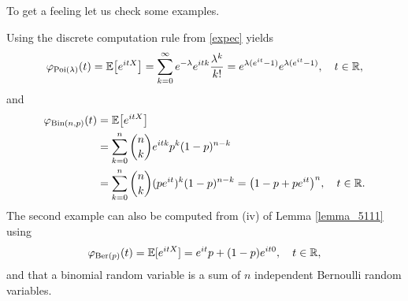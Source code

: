 	To get a feeling let us check some examples.
	\begin{example}
		Using the discrete computation rule from \eqref{expec} yields
		$$\varphi_{\text{Poi}(\lambda)}(t) = \mathbb{E} \big[ e^{itX} \big] = \sum_{k=0}^{\infty} e^{-\lambda} e^{itk} \frac{\lambda^k}{k!} = e^{\lambda (e^{it}-1)}e^{\lambda ( e^{it} - 1)},\quad t\in\mathbb{R},$$
		and
		\begin{align*}
			\varphi_{\text{Bin}(n,p)}(t)
			&=\mathbb{E}\big[ e^{itX} \big]\\
			&= \sum\limits_{k=0}^{n} {n\choose k} e^{itk}p^k (1-p)^{n-k}\\
			&= \sum\limits_{k=0}^{n}{n\choose k} (p  e^{it})^k (1-p)^{n-k} = \big( 1 - p +p  e^{it} \big)^n,\quad t\in\mathbb{R}.
		\end{align*}
		The second example can also be computed from (iv) of Lemma \ref{lemma_5111} using
		\begin{align*}
			\varphi_{\text{Ber}(p)}(t)=\mathbb{E}[e^{itX}]=e^{it}p+(1-p)e^{it0},\quad t\in\mathbb{R},
		\end{align*}
and that a binomial random variable is a sum of $n$ independent Bernoulli random variables.

		
	\end{example}
	
